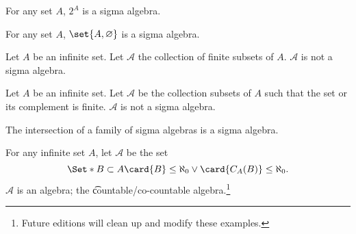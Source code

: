 \begin{example}
For any set $A$, $2^{A}$ is a sigma algebra.\end{example}
\begin{example}
For any set $A$,
$\set{A, \varnothing}$ is a sigma algebra.\end{example}
\begin{example}
Let $A$ be an infinite set.
Let $\mathcal{A} $ the collection of finite subsets of $A$.
$\mathcal{A} $ is not a sigma algebra.\end{example}
\begin{example}
Let $A$ be an infinite set.
Let $\mathcal{A} $ be the collection
subsets of $A$ such that the set or its
complement is finite.
$\mathcal{A} $ is not a sigma algebra.\end{example}
\begin{proposition}

\label{sigma_algebra:sigmaintersection}The intersection of a family of sigma algebras is a sigma algebra.\end{proposition}
\begin{example}
For any infinite set $A$, let $\mathcal{A} $ be the set
  \[
\Set*{
B \subset A
}{
\card{B} \leq \aleph_0 \lor
\card{C_{A}(B)} \leq \aleph_0
}.
  \]
$\mathcal{A} $ is an algebra; the \t{countable/co-countable algebra}.\footnote{Future editions will clean up and modify these examples.}\end{example}